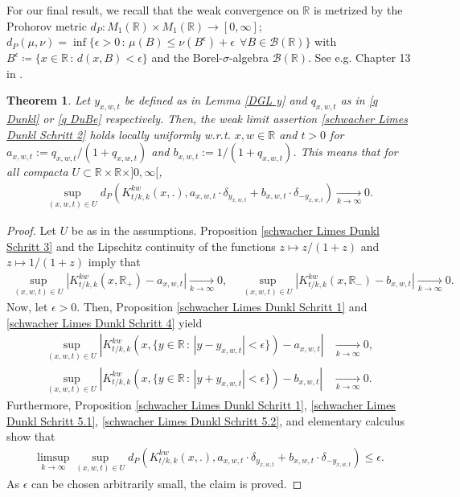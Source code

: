 \documentclass[reqno]{amsart}
\theoremstyle{plain}
\newtheorem{theorem}{Theorem}[section]
\theoremstyle{definition}
\numberwithin{equation}{section}
\newcommand{\R}{\mathbb{R}}
\begin{document}
 For  our final result,
 we recall that the weak convergence on $\mathbb R$ is metrized by the Prohorov metric $d_P:M_1(\R) \times M_1(\R) \to [0,\infty]$;
$d_P(\mu,\nu)=\inf\{\epsilon>0 \, : \, \mu(B) \leq \nu(B^{\epsilon}) + \epsilon \>\> \forall B \in \mathcal{B}(\R) \}$
with $B^{\epsilon} \coloneqq \{x \in \R \, : \, d(x,B) < \epsilon \}$ and the Borel-$\sigma$-algebra $\mathcal{B}(\R)$.
See e.g. Chapter 13 in \cite{Kl}.

 

\begin{theorem}
Let $y_{x,w,t}$ be defined as in Lemma \ref{DGL y} and
 $q_{x,w,t}$  as in \eqref{q Dunkl} or \eqref{q DuBe} respectively.
Then, the weak limit assertion \eqref{schwacher Limes Dunkl Schritt 2} holds locally uniformly w.r.t. $x,w \in \R$ and $t>0$ for
$a_{x,w,t}:=q_{x,w,t}/(1+q_{x,w,t})$ and $b_{x,w,t}:=1/(1+q_{x,w,t})$.
This means that for all compacta $U \subset \R \times \R \times ]0,\infty[$,
\begin{align}
\sup\limits_{(x,w,t) \in U} d_P(K_{t/k,k}^{k w}(x,.),a_{x,w,t} \cdot \delta_{y_{x,w,t}} + b_{x,w,t} \cdot \delta_{-y_{x,w,t}})
\xrightarrow[k \to \infty]{} 0. \label{schwacher Limes Dunkl Schritt 6}
\end{align}
\end{theorem}

\begin{proof}
Let $U$ be as in the assumptions.
 Proposition \ref{schwacher Limes Dunkl Schritt 3} and the Lipschitz continuity of the functions $z \mapsto z/(1+z)$ and $z \mapsto 1/(1+z)$ imply 
that
\begin{align}
\sup\limits_{(x,w,t) \in U} |K_{t/k,k}^{kw}(x,\R_+)-a_{x,w,t}| 
\xrightarrow[k \to \infty]{} 0, 
\>\>\>\>\>
\sup\limits_{(x,w,t) \in U} |K_{t/k,k}^{kw}(x,\R_-)-b_{x,w,t}| 
\xrightarrow[k \to \infty]{} 0. 
\label{schwacher Limes Dunkl Schritt 4}
\end{align}
Now, let $\epsilon>0$. Then, Proposition \ref{schwacher Limes Dunkl Schritt 1} and \eqref{schwacher Limes Dunkl Schritt 4} yield
\begin{align}
\sup\limits_{(x,w,t) \in U} |K_{t/k,k}^{kw}(x,\{y \in \R \, : \, |y-y_{x,w,t}| < \epsilon\}) - a_{x,w,t}|
&\xrightarrow[k \to \infty]{} 0, 
\label{schwacher Limes Dunkl Schritt 5.1} \\
\sup\limits_{(x,w,t) \in U} |K_{t/k,k}^{kw}(x,\{y \in \R \, : \, |y+y_{x,w,t}| < \epsilon\})  - b_{x,w,t}|
&\xrightarrow[k \to \infty]{} 0.
\label{schwacher Limes Dunkl Schritt 5.2}
\end{align}
Furthermore, Proposition \ref{schwacher Limes Dunkl Schritt 1}, \eqref{schwacher Limes Dunkl Schritt 5.1}, \eqref{schwacher Limes Dunkl Schritt 5.2}, 
and elementary calculus show that
\begin{align*}
\limsup\limits_{k \to \infty} \sup\limits_{(x,w,t) \in U} d_P(K_{t/k,k}^{k w}(x,.),a_{x,w,t} \cdot \delta_{y_{x,w,t}} + b_{x,w,t} \cdot \delta_{-y_{x,w,t}}) \leq \epsilon.
\end{align*}
As $\epsilon$ can be chosen arbitrarily small, the claim is proved.
\end{proof}
\end{document}
